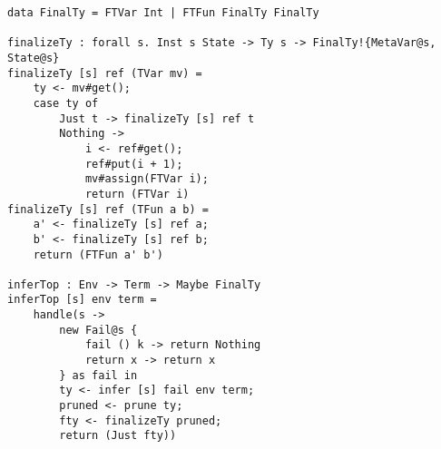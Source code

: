 \begin{verbatim}
data FinalTy = FTVar Int | FTFun FinalTy FinalTy

finalizeTy : forall s. Inst s State -> Ty s -> FinalTy!{MetaVar@s, State@s}
finalizeTy [s] ref (TVar mv) =
	ty <- mv#get();
	case ty of
		Just t -> finalizeTy [s] ref t
		Nothing ->
			i <- ref#get();
			ref#put(i + 1);
			mv#assign(FTVar i);
			return (FTVar i)
finalizeTy [s] ref (TFun a b) =
	a' <- finalizeTy [s] ref a;
	b' <- finalizeTy [s] ref b;
	return (FTFun a' b')

inferTop : Env -> Term -> Maybe FinalTy
inferTop [s] env term =
	handle(s ->
		new Fail@s {
			fail () k -> return Nothing
			return x -> return x
		} as fail in
		ty <- infer [s] fail env term;
		pruned <- prune ty;
		fty <- finalizeTy pruned;
		return (Just fty))
\end{verbatim}

